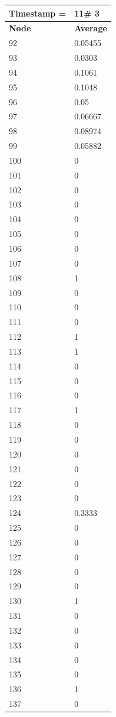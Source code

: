 \begin{tabular}{|l||l|}
\hline
\textbf{Timestamp =} & \textbf{11}\# 3\\\hline
	\textbf{Node} & \textbf{Average} \\ \hline
\hline
	92 & 0.05455 \\ \hline
	93 & 0.0303 \\ \hline
	94 & 0.1061 \\ \hline
	95 & 0.1048 \\ \hline
	96 & 0.05 \\ \hline
	97 & 0.06667 \\ \hline
	98 & 0.08974 \\ \hline
	99 & 0.05882 \\ \hline
	100 & 0 \\ \hline
	101 & 0 \\ \hline
	102 & 0 \\ \hline
	103 & 0 \\ \hline
	104 & 0 \\ \hline
	105 & 0 \\ \hline
	106 & 0 \\ \hline
	107 & 0 \\ \hline
	108 & 1 \\ \hline
	109 & 0 \\ \hline
	110 & 0 \\ \hline
	111 & 0 \\ \hline
	112 & 1 \\ \hline
	113 & 1 \\ \hline
	114 & 0 \\ \hline
	115 & 0 \\ \hline
	116 & 0 \\ \hline
	117 & 1 \\ \hline
	118 & 0 \\ \hline
	119 & 0 \\ \hline
	120 & 0 \\ \hline
	121 & 0 \\ \hline
	122 & 0 \\ \hline
	123 & 0 \\ \hline
	124 & 0.3333 \\ \hline
	125 & 0 \\ \hline
	126 & 0 \\ \hline
	127 & 0 \\ \hline
	128 & 0 \\ \hline
	129 & 0 \\ \hline
	130 & 1 \\ \hline
	131 & 0 \\ \hline
	132 & 0 \\ \hline
	133 & 0 \\ \hline
	134 & 0 \\ \hline
	135 & 0 \\ \hline
	136 & 1 \\ \hline
	137 & 0 \\ \hline
\end{tabular}

